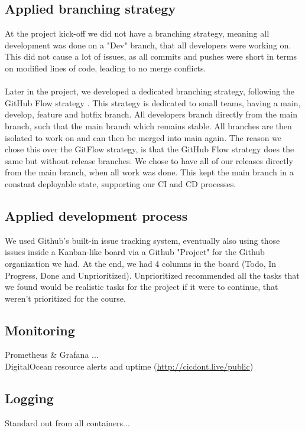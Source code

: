 \subsection{Applied branching strategy}\label{subsec:branching_strategy}
At the project kick-off we did not have a branching strategy, meaning all development was done on a "Dev" branch, that all developers were working on. This did not cause a lot of issues, as all commits and pushes were short in terms on modified lines of code, leading to no merge conflicts.
\\\\
Later in the project, we developed a dedicated branching strategy, following the GitHub Flow strategy \cite{branching_strategy}. This strategy is dedicated to small teams, having a main, develop, feature and hotfix branch. All developers branch directly from the main branch, such that the main branch which remains stable. All branches are then isolated to work on and can then be merged into main again. The reason we chose this over the GitFlow strategy, is that the GitHub Flow strategy does the same but without release branches. We chose to have all of our releases directly from the main branch, when all work was done. This kept the main branch in a constant deployable state, supporting our CI and CD processes.

\subsection{Applied development process}
We used Github's built-in issue tracking system, eventually also using those issues inside a Kanban-like board via a Github "Project" for the Github organization we had. At the end, we had 4 columns in the board (Todo, In Progress, Done and Unprioritized). Unprioritized recommended all the tasks that we found would be realistic tasks for the project if it were to continue, that weren't prioritized for the course. 
\subsection{Monitoring}
Prometheus \& Grafana ... \\
DigitalOcean resource alerts and uptime (\url{http://cicdont.live/public})
\subsection{Logging}
Standard out from all containers...
